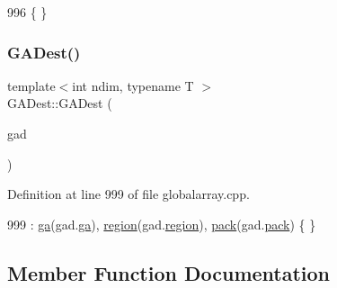 \begin{DoxyCode}
996 \{ \}
\end{DoxyCode}
\hypertarget{classshark_1_1ndim_1_1_g_a_dest_a349841f3baadf92afdb6c41198f1c36c}{}\label{classshark_1_1ndim_1_1_g_a_dest_a349841f3baadf92afdb6c41198f1c36c} 
\subsubsection{\texorpdfstring{G\+A\+Dest()}{GADest()}\hspace{0.1cm}{\footnotesize\ttfamily [2/2]}}
{\footnotesize\ttfamily template$<$int ndim, typename T $>$ \\
G\+A\+Dest\+::\+G\+A\+Dest (\begin{DoxyParamCaption}\item[{const \hyperlink{classshark_1_1ndim_1_1_g_a_dest}{G\+A\+Dest}$<$ ndim, T $>$ \&}]{gad }\end{DoxyParamCaption})}



Definition at line 999 of file globalarray.\+cpp.


\begin{DoxyCode}
999 : \hyperlink{classshark_1_1ndim_1_1_g_a_dest_aa64cb1bd1f2155c6cca997e4ba69760e}{ga}(gad.\hyperlink{classshark_1_1ndim_1_1_g_a_dest_aa64cb1bd1f2155c6cca997e4ba69760e}{ga}), \hyperlink{classshark_1_1ndim_1_1_g_a_dest_a13e2c3f9bc86ceec20bd4c98bf4699b2}{region}(gad.\hyperlink{classshark_1_1ndim_1_1_g_a_dest_a13e2c3f9bc86ceec20bd4c98bf4699b2}{region}), \hyperlink{classshark_1_1ndim_1_1_g_a_dest_aeef6b8ca8d9d57db09b32949e0493aca}{pack}(gad.\hyperlink{classshark_1_1ndim_1_1_g_a_dest_aeef6b8ca8d9d57db09b32949e0493aca}{pack}) \{ \}
\end{DoxyCode}


\subsection{Member Function Documentation}
\hypertarget{classshark_1_1ndim_1_1_g_a_dest_ab6632790b5f89a3a19a24a4bf2988e01}{}\label{classshark_1_1ndim_1_1_g_a_dest_ab6632790b5f89a3a19a24a4bf2988e01} 
